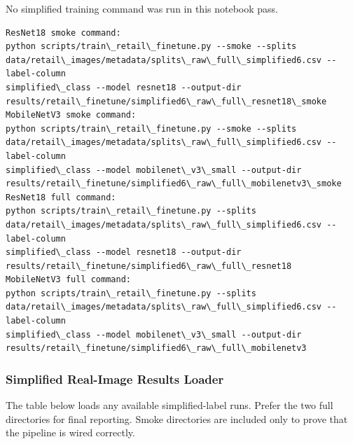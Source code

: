 \documentclass[11pt]{article}
\begin{document}
    No simplified training command was run in this notebook pass.

    
    \begin{Verbatim}[commandchars=\\\{\}]
ResNet18 smoke command:
python scripts/train\_retail\_finetune.py --smoke --splits
data/retail\_images/metadata/splits\_raw\_full\_simplified6.csv --label-column
simplified\_class --model resnet18 --output-dir
results/retail\_finetune/simplified6\_raw\_full\_resnet18\_smoke
MobileNetV3 smoke command:
python scripts/train\_retail\_finetune.py --smoke --splits
data/retail\_images/metadata/splits\_raw\_full\_simplified6.csv --label-column
simplified\_class --model mobilenet\_v3\_small --output-dir
results/retail\_finetune/simplified6\_raw\_full\_mobilenetv3\_smoke
ResNet18 full command:
python scripts/train\_retail\_finetune.py --splits
data/retail\_images/metadata/splits\_raw\_full\_simplified6.csv --label-column
simplified\_class --model resnet18 --output-dir
results/retail\_finetune/simplified6\_raw\_full\_resnet18
MobileNetV3 full command:
python scripts/train\_retail\_finetune.py --splits
data/retail\_images/metadata/splits\_raw\_full\_simplified6.csv --label-column
simplified\_class --model mobilenet\_v3\_small --output-dir
results/retail\_finetune/simplified6\_raw\_full\_mobilenetv3
    \end{Verbatim}

    \subsubsection{Simplified Real-Image Results
Loader}\label{simplified-real-image-results-loader}

The table below loads any available simplified-label runs. Prefer the
two full directories for final reporting. Smoke directories are included
only to prove that the pipeline is wired correctly.
\end{document}
